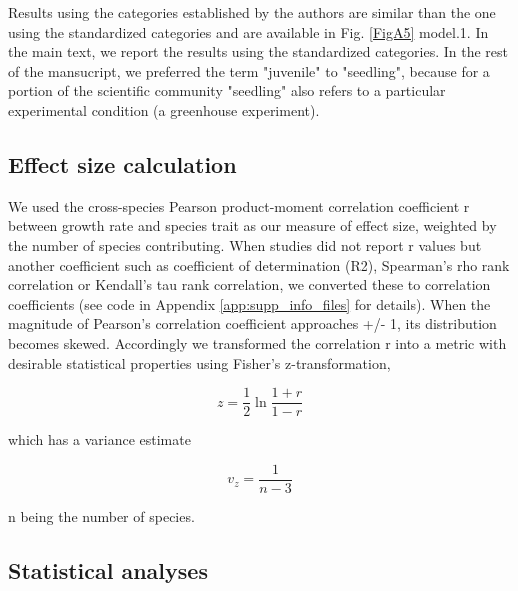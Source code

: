 \documentclass[a4paper]{article}\usepackage[]{graphicx}\usepackage[]{color}
\begin{document}
Results using the categories established by the authors are similar than the one using the standardized categories and are available in Fig. \ref{FigA5} model.1. In the main text, we report the results using the standardized categories. In the rest of the mansucript, we preferred the term "juvenile" to "seedling", because for a portion of the scientific community "seedling" also refers to a particular experimental condition (a greenhouse experiment).


\subsection*{Effect size calculation}\label{effect-size-calculation}

We used the cross-species Pearson product-moment correlation coefficient r between growth rate and species trait as our measure of effect size, weighted by the number of species contributing. When studies did not report r values but another coefficient such as coefficient of determination (R2), Spearman's rho rank correlation or Kendall's tau rank correlation, we converted these to correlation coefficients  \citep{Lajeunesse:2013tm} (see code in Appendix \ref{app:supp_info_files} for details). When the magnitude of Pearson's correlation coefficient approaches +/- 1, its distribution becomes skewed. Accordingly we transformed the correlation r into a metric with desirable statistical properties using Fisher's z-transformation,

\[ z = \frac{1}{2} \ln \frac{1+r}{1-r} \]

which has a variance estimate

\[ v_z= \frac{1}{n-3} \]

n being the number of species.

\subsection*{Statistical analyses}\label{statistical-analyses}
\end{document}

